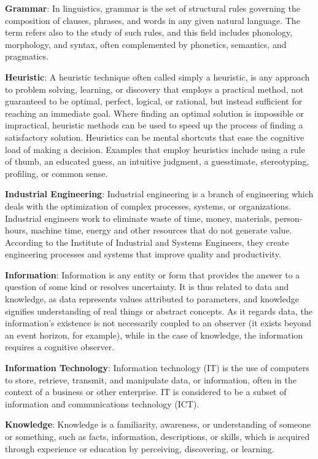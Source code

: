 \documentclass[b5paper,]{book}
\theoremstyle{definition}
\theoremstyle{definition}
\theoremstyle{definition}
\theoremstyle{remark}
\begin{document}
\textbf{Grammar}: In linguistics, grammar is the set of structural rules
governing the composition of clauses, phrases, and words in any given
natural language. The term refers also to the study of such rules, and
this field includes phonology, morphology, and syntax, often
complemented by phonetics, semantics, and pragmatics.

\textbf{Heuristic}: A heuristic technique often called simply a
heuristic, is any approach to problem solving, learning, or discovery
that employs a practical method, not guaranteed to be optimal, perfect,
logical, or rational, but instead sufficient for reaching an immediate
goal. Where finding an optimal solution is impossible or impractical,
heuristic methods can be used to speed up the process of finding a
satisfactory solution. Heuristics can be mental shortcuts that ease the
cognitive load of making a decision. Examples that employ heuristics
include using a rule of thumb, an educated guess, an intuitive judgment,
a guesstimate, stereotyping, profiling, or common sense.

\textbf{Industrial Engineering}: Industrial engineering is a branch of
engineering which deals with the optimization of complex processes,
systems, or organizations. Industrial engineers work to eliminate waste
of time, money, materials, person-hours, machine time, energy and other
resources that do not generate value. According to the Institute of
Industrial and Systems Engineers, they create engineering processes and
systems that improve quality and productivity.

\textbf{Information}: Information is any entity or form that provides
the answer to a question of some kind or resolves uncertainty. It is
thus related to data and knowledge, as data represents values attributed
to parameters, and knowledge signifies understanding of real things or
abstract concepts. As it regards data, the information's existence is
not necessarily coupled to an observer (it exists beyond an event
horizon, for example), while in the case of knowledge, the information
requires a cognitive observer.

\textbf{Information Technology}: Information technology (IT) is the use
of computers to store, retrieve, transmit, and manipulate data, or
information, often in the context of a business or other enterprise. IT
is considered to be a subset of information and communications
technology (ICT).

\textbf{Knowledge}: Knowledge is a familiarity, awareness, or
understanding of someone or something, such as facts, information,
descriptions, or skills, which is acquired through experience or
education by perceiving, discovering, or learning.
\end{document}

